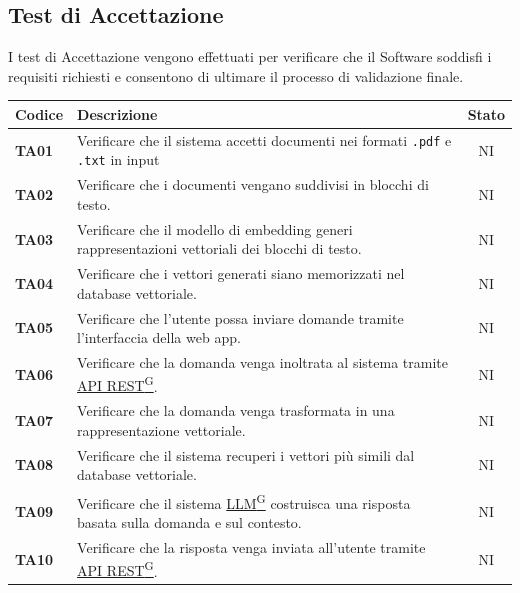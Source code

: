 \documentclass{article}
\begin{document}
\newpage
\subsection{Test di Accettazione} %
I test di Accettazione vengono effettuati per verificare che il Software soddisfi i requisiti richiesti e consentono di ultimare il processo di validazione finale.

\begin{longtable}{|>{\centering\arraybackslash}m{}|>{\raggedright\arraybackslash}m{}|c|}
    \hline
    \textbf{Codice} & \textbf{Descrizione} & \textbf{Stato} \\
    \hline
    \textbf{TA01} & Verificare che il sistema accetti documenti nei formati \texttt{.pdf} e \texttt{.txt} in input & NI \\
    \hline
    \textbf{TA02} & Verificare che i documenti vengano suddivisi in blocchi di testo. & NI \\
    \hline
    \textbf{TA03} & Verificare che il modello di embedding generi rappresentazioni vettoriali dei blocchi di testo. & NI\\
    \hline
    \textbf{TA04} & Verificare che i vettori generati siano memorizzati nel database vettoriale. & NI\\
    \hline
    \textbf{TA05} & Verificare che l’utente possa inviare domande tramite l’interfaccia della web app.& NI\\
    \hline
    \textbf{TA06} & Verificare che la domanda venga inoltrata al sistema tramite \href{https://code7crusaders.github.io/docs/PB/documentazione_interna/glossario.html#api-rest-representational-state-transfer}{API REST\textsuperscript{G}}. & NI\\
    \hline
    \textbf{TA07} & Verificare che la domanda venga trasformata in una rappresentazione vettoriale. & NI\\
    \hline
    \textbf{TA08} & Verificare che il sistema recuperi i vettori più simili dal database vettoriale. & NI\\
    \hline
    \textbf{TA09} & Verificare che il sistema \href{https://code7crusaders.github.io/docs/PB/documentazione_interna/glossario.html#llm-large-language-model}{LLM\textsuperscript{G}} costruisca una risposta basata sulla domanda e sul contesto. & NI\\
    \hline
    \textbf{TA10} & Verificare che la risposta venga inviata all’utente tramite \href{https://code7crusaders.github.io/docs/PB/documentazione_interna/glossario.html#api-rest-representational-state-transfer}{API REST\textsuperscript{G}}.& NI\\

\end{longtable}
\end{document}
